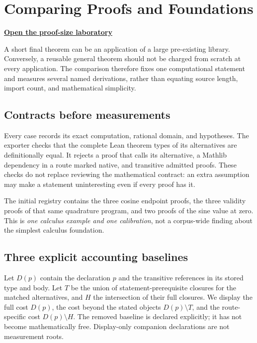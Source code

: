 \chapter{Comparing Proofs and Foundations}\label{ch:proof-comparison}

\begin{center}
\href{proof-bench/index.html}{\textbf{Open the proof-size laboratory}}
\end{center}

A short final theorem can be an application of a large pre-existing library.
Conversely, a reusable general theorem should not be charged from scratch at
every application. The comparison therefore fixes one computational statement
and measures several named derivations, rather than equating source length,
import count, and mathematical simplicity.

\section{Contracts before measurements}
Every case records its exact computation, rational domain, and hypotheses.
The exporter checks that the complete Lean theorem types of its alternatives
are definitionally equal. It rejects a proof that calls its alternative, a
Mathlib dependency in a route marked native, and transitive admitted proofs.
These checks do not replace reviewing the mathematical contract: an extra
assumption may make a statement uninteresting even if every proof has it.

The initial registry contains the three cosine endpoint proofs, the three
validity proofs of that same quadrature program, and two proofs of the sine
value at zero. This is \emph{one calculus example and one calibration}, not a
corpus-wide finding about the simplest calculus foundation.

\section{Three explicit accounting baselines}
Let $D(p)$ contain the declaration $p$ and the transitive references in its
stored type and body. Let $T$ be the union of statement-prerequisite closures
for the matched alternatives, and $H$ the intersection of their full closures.
We display the full cost $D(p)$, the cost beyond the stated objects
$D(p)\setminus T$, and the route-specific cost $D(p)\setminus H$.
The removed baseline is declared explicitly; it has not become mathematically
free. Display-only companion declarations are not measurement roots.

